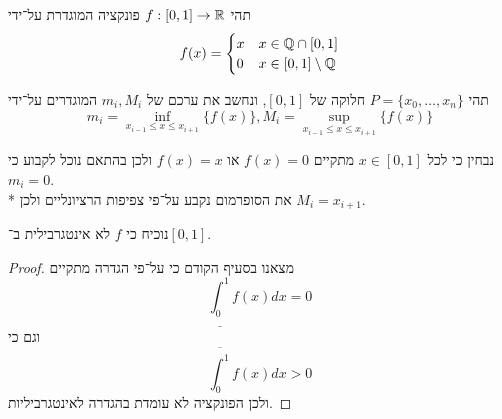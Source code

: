 \Question{}
תהי $f : [0, 1] \to \mathbb{R}$ פונקציה המוגדרת על־ידי
\[
	f(x) = \begin{cases}
		x & x \in \mathbb{Q} \cap [0, 1] \\
		0 & x \in [0, 1] \setminus \mathbb{Q}
	\end{cases}
\]

\Subquestion{}
תהי $P = \{x_0, \dots, x_n\}$ חלוקה של $[0, 1]$, ונחשב את ערכם של $m_i, M_i$ המוגדרים על־ידי
\[
	m_i = \inf_{x_{i - 1} \le x \le x_{i + 1}} \{ f(x) \},
	M_i = \sup_{x_{i - 1} \le x \le x_{i + 1}} \{ f(x) \}
\]

נבחין כי לכל $x \in [0, 1]$ מתקיים $f(x) = 0$ או $f(x) = x$ ולכן בהתאם נוכל לקבוע כי $m_i = 0$. \\*
את הסופרמום נקבע על־פי צפיפות הרציונליים ולכן $M_i = x_{i + 1}$.

\Subquestion{}
נוכיח כי $f$ לא אינטגרבילית ב־$[0, 1]$.
\begin{proof}
	מצאנו בסעיף הקודם כי על־פי הגדרה מתקיים
	\[
		\underline{\int_0^1} f(x) dx = 0
	\]
	וגם כי
	\[
		\overline{\int_0^1} f(x) dx > 0
	\]
	ולכן הפונקציה לא עומדת בהגדרה לאינטגרביליות.
\end{proof}


